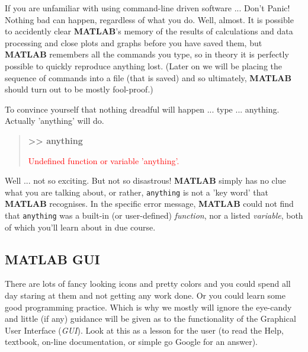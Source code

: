 \documentclass{tufte-book} %
\newenvironment{docspec}{\begin{quotation}\ttfamily\parskip0pt\parindent0pt\ignorespaces}{\end{quotation}}
\begin{document}
If you are unfamiliar with using command-line driven software ... Don't Panic!\cite{Adams1979} Nothing bad can happen, regardless of what you do. Well, almost. It is possible to accidently clear \textbf{MATLAB}'s memory of the results of calculations and data processing and close plots and graphs before you have saved them, but \textbf{MATLAB} remembers all the commands you type, so in theory it is perfectly possible to quickly reproduce anything lost. (Later on we will be placing the sequence of commands into a file (that is saved) and so ultimately, \textbf{MATLAB} should turn out to be mostly fool-proof.)

To convince yourself that nothing dreadful will happen ... type ... anything. Actually 'anything' will do.

\begin{docspec}
\textbf{>> anything}

\textcolor{red}{Undefined function or variable 'anything'.}
\end{docspec}

Well ... not so exciting. But not so disastrous! \textbf{MATLAB} simply has no clue what you are talking about, or rather, \texttt{anything} is not a 'key word' that \textbf{MATLAB} recognises. In the specific error message, \textbf{MATLAB} could not find that \texttt{anything} was a built-in (or user-defined) \textit{function}, nor a listed \textit{variable}, both of which you'll learn about in due course.


\subsection{MATLAB GUI}

There are lots of fancy looking icons and pretty colors and you could spend all day staring at them and not getting any work done. Or you could learn some good programming practice. Which is why we mostly will ignore the eye-candy and little (if any) guidance will be given as to the functionality of the Graphical User Interface (\textit{GUI}). Look at this as a lesson for the user (to read the \textsf{Help}, textbook, on-line documentation, or simple go Google for an answer).
\end{document}
